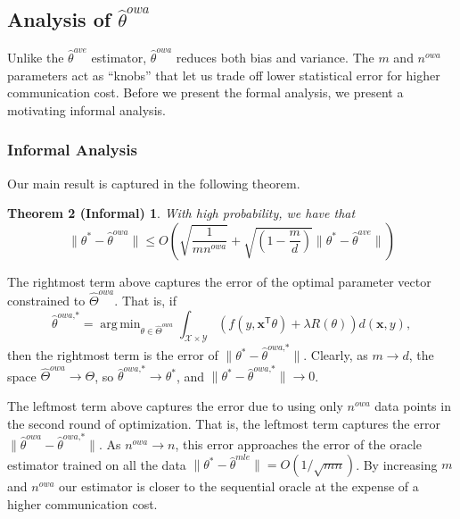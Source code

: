 \documentclass[twoside]{article}
\DeclareMathOperator*{\argmin}{arg\,min}
\newcommand{\nowa}{n^{\textit{owa}}}
\newcommand{\Y}{\mathcal{Y}}
\newcommand{\X}{\mathcal{X}}
\newcommand{\W}{{\hat \Theta^{\textit{owa}}}}
\newcommand{\x}{\mathbf{x}}
\newcommand{\w}{\theta}
\newcommand{\wowa}{\hat\w^{owa}}
\newcommand{\wowastar}{\hat\w^{\textit{owa,*}}}
\newcommand{\wave}{\hat\w^{ave}}
\newcommand{\wmle}{\hat\w^{mle}}
\newcommand{\wstar}{{\w^{*}}}
\newcommand{\trans}[1]{\ensuremath{{#1}^{\mathsf{T}}}}
\newcommand{\ltwo}[1]{{\lVert {#1} \rVert}}
\begin{document}
\subsection {Analysis of $\wowa$}

Unlike the $\wave$ estimator,
$\wowa$ reduces both bias and variance.
The $m$ and $\nowa$ parameters act as ``knobs'' that let us trade off lower statistical error for higher communication cost.
Before we present the formal analysis,
we present a motivating informal analysis.

\subsubsection{Informal Analysis}
Our main result is captured in the following theorem.
\newtheorem*{theoreminf}{Theorem 2 (Informal)}
\begin{theoreminf}
With high probability, we have that
\begin{equation}
\nonumber
\ltwo{\wstar-\wowa}
\le
O\!\left(\!\!
    \sqrt{\frac{1}{m\nowa}}
    +
    \sqrt{\left(1-\frac{m}{d}\right)}\ltwo{\wstar-\wave}
\right)
\label{eq:informal}
\end{equation}
\label{thm:informal}
\end{theoreminf}
\vspace{-0.25in}
The rightmost term above captures the error of the optimal parameter vector constrained to $\W$.
That is, if
\begin{equation}
\wowastar = \argmin_{\w\in\W} \int_{\X\times\Y} \left(f(y,\trans\x\w) + \lambda R(\w)\right) d(\x,y)
,
\end{equation}
then the rightmost term is the error of $\ltwo{\wstar-\wowastar}$.
Clearly, as $m \to d$, the space $\W \to \Theta$, so $\wowastar\to\wstar$, and $\ltwo{\wstar-\wowastar}\to 0$.

The leftmost term above captures the error due to using only $\nowa$ data points in the second round of optimization.
That is, the leftmost term captures the error $\ltwo{\wowa-\wowastar}$.
As $\nowa\to n$, this error approaches the error of the oracle estimator trained on all the data $\ltwo{\wstar-\wmle}=O(1/\sqrt{mn})$.
By increasing $m$ and $\nowa$ our estimator is closer to the sequential oracle
at the expense of a higher communication cost.
\end{document}
